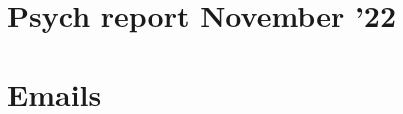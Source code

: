 \documentclass[parskip=full]{report}
\begin{document}
\tableofcontents
\listoftodos[Labels]

\chapter{Psych report November '22}


\chapter{Emails}



\immediate\closeout\textfile
\end{document}
